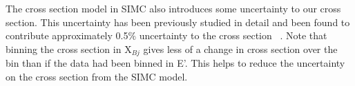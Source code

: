 The cross section model in SIMC also introduces some uncertainty to our cross section. This uncertainty has been previously studied in detail and been found to contribute approximately 0.5$\%$ uncertainty to the cross section ~\cite{Thesis:Nguyen}. Note that binning the cross section in X$_{Bj}$ gives less of a change in cross section over the bin than if the data had been binned in E'. This helps to reduce the uncertainty on the cross section from the SIMC model.



